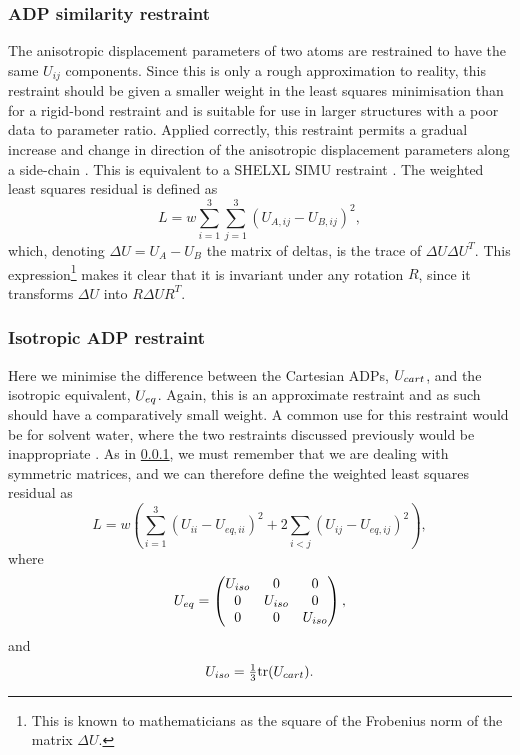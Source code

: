 \documentclass[pdf]{iucr}
\begin{document}


\subsubsection{ADP similarity restraint}
\label{ADP:similarity}
The anisotropic displacement parameters of two atoms are restrained to have the same $U_{ij}$ components. Since this is only a rough approximation to reality, this restraint should be given a smaller weight in the least squares minimisation than for a rigid-bond restraint and is suitable for use in larger structures with a poor data to parameter ratio. Applied correctly, this restraint permits a gradual increase and change in direction of the anisotropic displacement parameters along a side-chain \cite{SHELX:man97}. This is equivalent to a SHELXL SIMU restraint \cite{SHELX:man97}.
The weighted least squares residual is defined as
\begin{equation}
\label{eqn:adp_similarity}
L = w \sum_{i=1}^3 \sum_{j=1}^3 (U_{A,ij} - U_{B,ij})^2,
\end{equation}
which, denoting $\Delta U=U_A - U_B$ the matrix of deltas, is the trace of $\Delta U \Delta U^T$. This expression\footnote{This is known to mathematicians as the square of the Frobenius norm of the matrix $\Delta U$.} makes it clear that it is invariant under any rotation $R$, since it transforms $\Delta U$ into $R\Delta U R^T$. 



\subsubsection{Isotropic ADP restraint}
Here we minimise the difference between the Cartesian ADPs, $U_{cart}$, and the isotropic equivalent, $U_{eq}$. Again, this is an approximate restraint and as such should have a comparatively small weight. A common use for this restraint would be for solvent water, where the two restraints discussed previously would be inappropriate \cite{SHELX:man97}. As in \textsection \ref{ADP:similarity}, we must remember that we are dealing with symmetric matrices, and we can therefore define the weighted least squares residual as
\begin{equation}
\label{eqn:isotropic_adp}
L = w \left( \sum_{i=1}^3 (U_{ii} - U_{eq,ii})^2 + 2 \sum_{i<j} (U_{ij} - U_{eq,ij})^2 \right) ,
\end{equation}
where
\begin{equation}
U_{eq} = 
\begin{pmatrix} U_{iso} & 0 & 0\\
  0 & U_{iso} & 0\\
  0 & 0 & U_{iso}\end{pmatrix},
\end{equation}
and
\begin{equation}
U_{iso} = \tfrac{1}{3} \mathrm{tr}(U_{cart}).
\end{equation}
\end{document}

